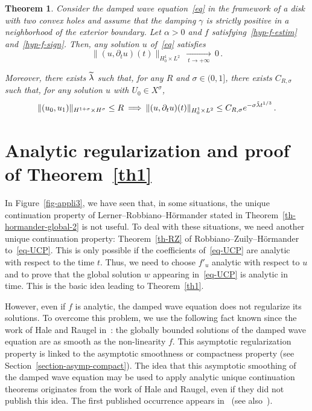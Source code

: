 \documentclass[10pt]{amsart}
\newtheorem{theo}{Theorem}[section]
\theoremstyle{definition}\newtheorem{defi}[theo]{Definition}\newtheorem{rema}[theo]{Remark}\newtheorem{exam}[theo]{Example}\newtheorem{exem}[theo]{Example}\newtheorem{nota}[theo]{Notation}
\let\oldtilde\tilde
\renewcommand*{\tilde}[1]{\mathchoice{\widetilde{#1}}{\widetilde{#1}}{\oldtilde{#1}}{\oldtilde{#1}}}\let\oldexists\exists
\renewcommand*{\exists}{\mathrel{\oldexists}}
\begin{document}
\begin{theo}\label{th-appli3}
Consider the damped wave equation~\eqref{eq} in the framework of a disk with two convex holes and assume that the damping $\gamma$ is strictly positive in a neighborhood of the exterior boundary. Let $\alpha>0$ and $f$ satisfying~\eqref{hyp-f-estim} and~\eqref{hyp-f-sign}. Then, any solution $u$ of~\eqref{eq} satisfies
\[
\|(u,\partial_t u)(t)\|_{H^1_0\times L^2}\,\xrightarrow[\:t\longrightarrow
+\infty\:]{}\,0\,.
\]

Moreover, there exists $\tilde\lambda$ such that, for any $R$ and $\sigma\in (0,1]$, there exists $C_{R,\sigma}$ such that, for any solution $u$ with $U_0\in X^\sigma$,
\[
\|(u_0,u_1)\|_{H^{1+\sigma}\times H^\sigma}\leq
R\:\Longrightarrow\:\|(u,\partial_t u)(t)\|_{H^1_0\times L^2} \leq
C_{R,\sigma}e^{-\sigma\tilde \lambda{t}^{1/3}}\,.
\]
\end{theo}


\section{Analytic regularization and proof of Theorem~\ref{th1}}\label{section-reg-analytic}

In Figure~\ref{fig-appli3}, we have seen that, in some situations, the unique continuation property of Lerner--Robbiano--H\"ormander stated in Theorem~\ref{th-hormander-global-2} is not useful. To deal with these situations, we need another unique continuation property: Theorem~\ref{th-RZ} of Robbiano--Zuily--H\"ormander to~\eqref{eq-UCP}. This is only possible if the coefficients of~\eqref{eq-UCP} are analytic with respect to the time $t$. Thus, we need to choose $f'_u$ analytic with respect to $u$ and to prove that the global solution $w$ appearing in~\eqref{eq-UCP} is analytic in time. This is the basic idea leading to Theorem~\ref{th1}.

However, even if $f$ is analytic, the damped wave equation does not regularize its solutions. To overcome this problem, we use the following fact known since the work of Hale and Raugel in~\cite{Hale-Raugel}: the globally bounded solutions of the damped wave equation are as smooth as the non-linearity $f$. This asymptotic regularization property is linked to the asymptotic smoothness or compactness property (see Section~\ref{section-asymp-compact}). The idea that this asymptotic smoothing of the damped wave equation may be used to apply analytic unique continuation theorems originates from the work of Hale and Raugel, even if they did not publish this idea. The first published occurrence appears in~\cite{RJ} (see also~\cite{RC}).
\end{document}
